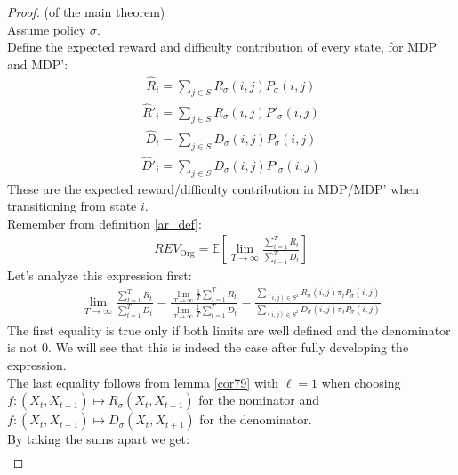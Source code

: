 \documentclass{article}
\newcommand{\E}[1]{\mathbb{E} \left[ #1 \right]}
\newcommand{\revorg}{\textit{REV}_\text{Org}}
\begin{document}
\begin{proof} (of the main theorem)\\
    Assume policy $\sigma$. \\
    Define the expected reward and difficulty contribution of every state, for MDP and MDP':
    \begin{gather*}
        \hat{R}_i = \sum\limits_{j \in S} R_\sigma(i,j)  P_\sigma(i,j)
    \end{gather*}
    \begin{gather*}
        \hat{R}'_i = \sum\limits_{j \in S} R_\sigma(i,j)  P'_\sigma(i,j)
    \end{gather*}
    \begin{gather*}
        \hat{D}_i = \sum\limits_{j \in S} D_\sigma(i,j)  P_\sigma(i,j)
    \end{gather*}
    \begin{gather*}
        \hat{D}'_i = \sum\limits_{j \in S} D_\sigma(i,j)  P'_\sigma(i,j)
    \end{gather*}
    These are the expected reward/difficulty contribution in MDP/MDP' when transitioning from state $i$. \\
    Remember from definition \ref{ar_def}:
    \begin{gather*}
        \revorg = \E{\lim\limits_{T\to\infty} \frac{\sum\limits_{t=1}^T R_t}{\sum\limits_{t=1}^T D_t}}
    \end{gather*}
    Let's analyze this expression first:
    \begin{gather*}
        \lim\limits_{T\to\infty} \frac{\sum\limits_{t=1}^T R_t}{\sum\limits_{t=1}^T D_t} =
        \frac{\lim\limits_{T\to\infty} \frac{1}{T} \sum\limits_{t=1}^T R_t}{\lim\limits_{T\to\infty} \frac{1}{T} \sum\limits_{t=1}^T D_t} = \frac{\sum\limits_{(i,j) \in S^2} R_\sigma(i,j) \pi_i P_\sigma(i,j)}{\sum\limits_{(i,j) \in S^2} D_\sigma(i,j) \pi_i P_\sigma(i,j)}
    \end{gather*}
    The first equality is true only if both limits are well defined and the denominator is not 0. We will see that this is indeed the case after fully developing the expression. \\
    The last equality follows from lemma \ref{cor79} with $\ell = 1$ when choosing \\
    $f: (X_t, X_{t+1}) \mapsto R_\sigma(X_t,X_{t+1})$ for the nominator and \\
    $f: (X_t, X_{t+1}) \mapsto D_\sigma(X_t,X_{t+1})$ for the denominator.\\
    By taking the sums apart we get:
    \begin{gather*}

\end{gather*}
\end{proof}
\end{document}
